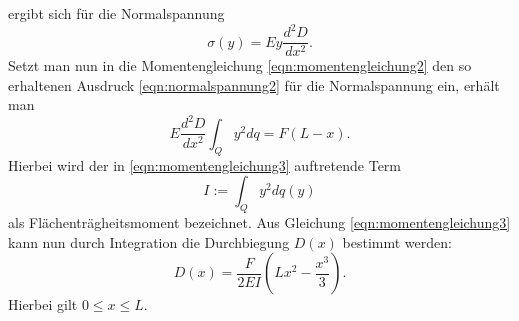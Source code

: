 ergibt sich für die Normalspannung
\begin{equation}
  \sigma (y) = E y \frac{d^2 D}{d x^2}.
  \label{eqn:normalspannung2}
\end{equation}
Setzt man nun in die Momentengleichung \eqref{eqn:momentengleichung2} den so erhaltenen Ausdruck \eqref{eqn:normalspannung2}
für die Normalspannung ein, erhält man
\begin{equation}
  E \frac{d^2 D}{d x^2} \int_Q y^2 dq = F(L - x).
  \label{eqn:momentengleichung3}
\end{equation}
Hierbei wird der in \eqref{eqn:momentengleichung3} auftretende Term
\begin{equation}
  I := \int_Q y^2 dq(y)
  \label{eqn:trägefläche}
\end{equation}
als Flächenträgheitsmoment bezeichnet.
Aus Gleichung \eqref{eqn:momentengleichung3} kann nun durch Integration die Durchbiegung $D(x)$ bestimmt
werden:
\begin{equation}
  D(x) = \frac{F}{2 E I} \left( L x^2 - \frac{x^3}{3} \right).
  \label{eqn:durchbiegungeinseitig}
\end{equation}
Hierbei gilt $0 \leq x \leq L$.

